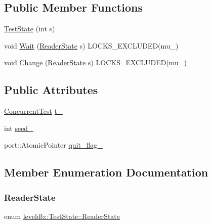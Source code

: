 \subsection*{Public Member Functions}
\begin{DoxyCompactItemize}
\item 
\mbox{\hyperlink{classleveldb_1_1_test_state_a777f2182bef5c524d580dc26ec589c2d}{Test\+State}} (int s)
\item 
void \mbox{\hyperlink{classleveldb_1_1_test_state_aceea3fc38e9f92e61b87815b43c38816}{Wait}} (\mbox{\hyperlink{classleveldb_1_1_test_state_a1bf1f0a16815237ff1f29d2925d9a4ad}{Reader\+State}} s) L\+O\+C\+K\+S\+\_\+\+E\+X\+C\+L\+U\+D\+ED(mu\+\_\+)
\item 
void \mbox{\hyperlink{classleveldb_1_1_test_state_adfbf3d6799e6f1fd4f43740262506df9}{Change}} (\mbox{\hyperlink{classleveldb_1_1_test_state_a1bf1f0a16815237ff1f29d2925d9a4ad}{Reader\+State}} s) L\+O\+C\+K\+S\+\_\+\+E\+X\+C\+L\+U\+D\+ED(mu\+\_\+)
\end{DoxyCompactItemize}
\subsection*{Public Attributes}
\begin{DoxyCompactItemize}
\item 
\mbox{\hyperlink{classleveldb_1_1_concurrent_test}{Concurrent\+Test}} \mbox{\hyperlink{classleveldb_1_1_test_state_a090fd0c59fb141c4843511b4020f05e9}{t\+\_\+}}
\item 
int \mbox{\hyperlink{classleveldb_1_1_test_state_aa44f519b574945b0061c88df42fd4725}{seed\+\_\+}}
\item 
port\+::\+Atomic\+Pointer \mbox{\hyperlink{classleveldb_1_1_test_state_a04e07cf69866e925db3fafd5cf9fa23f}{quit\+\_\+flag\+\_\+}}
\end{DoxyCompactItemize}


\subsection{Member Enumeration Documentation}
\mbox{\label{classleveldb_1_1_test_state_a1bf1f0a16815237ff1f29d2925d9a4ad}} 
\subsubsection{\texorpdfstring{ReaderState}{ReaderState}}
{\footnotesize\ttfamily enum \mbox{\hyperlink{classleveldb_1_1_test_state_a1bf1f0a16815237ff1f29d2925d9a4ad}{leveldb\+::\+Test\+State\+::\+Reader\+State}}}

